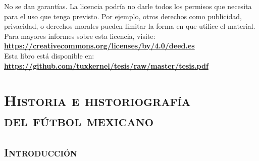 \documentclass[11pt,a5paper,twoside]{book} %
\begin{document}
\begin{minipage}{5cm}
\begin{tiny}
\noindent No se dan garantías. La licencia podría no darle todos los permisos que necesita para el uso que tenga previsto. Por ejemplo, otros derechos como publicidad, privacidad, o derechos morales pueden limitar la forma en que utilice el material. \\

\noindent Para mayores informes sobre esta licencia, visite: \\

\href{https://creativecommons.org/licenses/by/4.0/deed.es}{\textbf{https://creativecommons.org/licenses/by/4.0/deed.es}} \\

Esta libro está disponible en: \\

\href{https://github.com/tuxkernel/tesis/raw/master/tesis.pdf}{\textbf{https://github.com/tuxkernel/tesis/raw/master/tesis.pdf}}

\end{tiny}
\end{minipage}

\newpage
\pagestyle{empty}
\null\vfill

\newpage
\pagestyle{empty}
\null\vfill



\makeatletter
\renewcommand\@dotsep{200}
\makeatother

\newpage
\pagestyle{fancy}
\setcounter{page}{5}
\renewcommand{\contentsname}{Contenido}
\tableofcontents

\newpage
\pagestyle{empty}
\null\vfill

\chapter*{\centering\mdseries\Large\textsc{Historia e historiografía \\ del fútbol mexicano}}
\pagestyle{fancy}
\fancyhf{}
\fancyfoot[RO,LE]{\small\thepage}
\renewcommand{\headrulewidth}{0pt}
\setcounter{page}{7}

\section*{\mdseries\Large\textsc{Introducción}}
\end{document}
